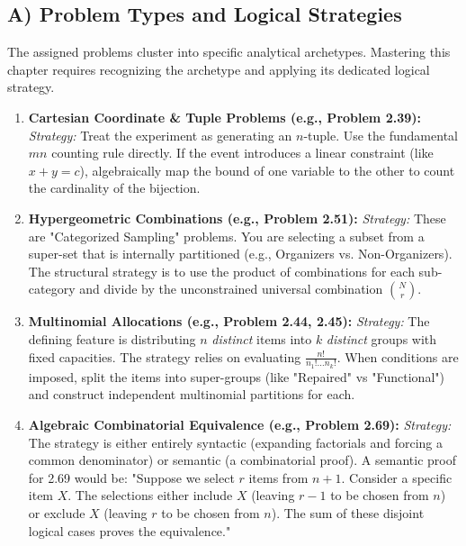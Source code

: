 \documentclass[11pt]{article}
\theoremstyle{definition}
\theoremstyle{plain}
\theoremstyle{remark}
\begin{document}
\subsection{A) Problem Types and Logical Strategies}
The assigned problems cluster into specific analytical archetypes. Mastering this chapter requires recognizing the archetype and applying its dedicated logical strategy.
\begin{enumerate}
    \item \textbf{Cartesian Coordinate \& Tuple Problems (e.g., Problem 2.39):} 
    \textit{Strategy:} Treat the experiment as generating an $n$-tuple. Use the fundamental $mn$ counting rule directly. If the event introduces a linear constraint (like $x+y=c$), algebraically map the bound of one variable to the other to count the cardinality of the bijection.
    \item \textbf{Hypergeometric Combinations (e.g., Problem 2.51):} 
    \textit{Strategy:} These are "Categorized Sampling" problems. You are selecting a subset from a super-set that is internally partitioned (e.g., Organizers vs. Non-Organizers). The structural strategy is to use the product of combinations for each sub-category and divide by the unconstrained universal combination $\binom{N}{r}$.
    \item \textbf{Multinomial Allocations (e.g., Problem 2.44, 2.45):} 
    \textit{Strategy:} The defining feature is distributing $n$ \textit{distinct} items into $k$ \textit{distinct} groups with fixed capacities. The strategy relies on evaluating $\frac{n!}{n_1! \dots n_k!}$. When conditions are imposed, split the items into super-groups (like "Repaired" vs "Functional") and construct independent multinomial partitions for each.
    \item \textbf{Algebraic Combinatorial Equivalence (e.g., Problem 2.69):}
    \textit{Strategy:} The strategy is either entirely syntactic (expanding factorials and forcing a common denominator) or semantic (a combinatorial proof). A semantic proof for 2.69 would be: "Suppose we select $r$ items from $n+1$. Consider a specific item $X$. The selections either include $X$ (leaving $r-1$ to be chosen from $n$) or exclude $X$ (leaving $r$ to be chosen from $n$). The sum of these disjoint logical cases proves the equivalence."
\end{enumerate}
\end{document}
